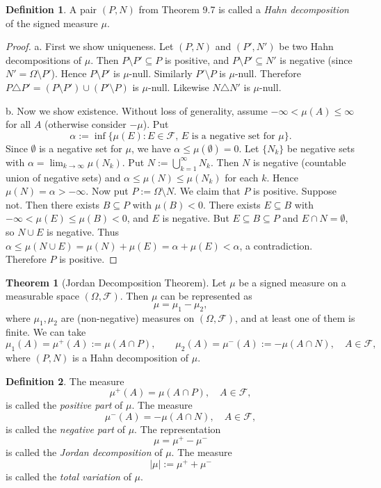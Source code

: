 \documentclass[11pt,a4paper]{article}
\theoremstyle{definition}
\newtheorem{definition}{Definition}[section]
\newtheorem{theorem}{Theorem}[section]
\begin{document}
\begin{definition}
A pair $(P,N)$ from Theorem 9.7 is called a \emph{Hahn decomposition} of the signed measure $\mu$.
\end{definition}

\begin{proof}
a. First we show uniqueness.  Let $(P,N)$ and $(P',N')$ be two Hahn decompositions of $\mu$.  Then $P\setminus P'\subseteq P$ is positive, and $P\setminus P' \subseteq N'$ is negative (since $N'=\Omega\setminus P'$).  Hence $P\setminus P'$ is $\mu$-null.  Similarly $P'\setminus P$ is $\mu$-null.  Therefore $P\triangle P'=(P\setminus P')\cup(P'\setminus P)$ is $\mu$-null.  Likewise $N\triangle N'$ is $\mu$-null.  

b. Now we show existence.  Without loss of generality, assume $-\infty<\mu(A)\le\infty$ for all $A$ (otherwise consider $-\mu$).  Put
\[
\alpha := \inf\{\mu(E):E\in\mathcal{F},\,E \text{ is a negative set for }\mu\}.
\]
Since $\emptyset$ is a negative set for $\mu$, we have $\alpha\le \mu(\emptyset)=0$.  Let $\{N_k\}$ be negative sets with $\alpha = \lim_{k\to\infty} \mu(N_k)$.  Put $N:=\bigcup_{k=1}^\infty N_k$.  Then $N$ is negative (countable union of negative sets) and $\alpha \le \mu(N)\le \mu(N_k)$ for each $k$.  Hence $\mu(N)=\alpha >-\infty$.  Now put $P := \Omega\setminus N$.  We claim that $P$ is positive.  Suppose not.  Then there exists $B\subseteq P$ with $\mu(B)<0$. There exists $E\subseteq B$ with $-\infty<\mu(E)\le\mu(B)<0$, and $E$ is negative.  But $E\subseteq B\subseteq P$ and $E\cap N=\emptyset$, so $N\cup E$ is negative.  Thus $\alpha \le \mu(N\cup E) = \mu(N) + \mu(E) = \alpha + \mu(E) < \alpha$, a contradiction.  Therefore $P$ is positive.  
\end{proof}

\begin{theorem}[Jordan Decomposition Theorem]
Let $\mu$ be a signed measure on a measurable space $(\Omega,\mathcal{F})$.  Then $\mu$ can be represented as
\[
\mu = \mu_1 - \mu_2,
\]
where $\mu_1,\mu_2$ are (non-negative) measures on $(\Omega,\mathcal{F})$, and at least one of them is finite.  We can take
\[
\mu_1(A) = \mu^+(A) := \mu(A\cap P), \qquad 
\mu_2(A) = \mu^-(A) := -\mu(A\cap N), \quad A\in\mathcal{F},
\]
where $(P,N)$ is a Hahn decomposition of $\mu$.
\end{theorem}

\begin{definition}
The measure
\[
\mu^+(A) = \mu(A\cap P),\quad A\in\mathcal{F},
\]
is called the \emph{positive part} of $\mu$.  The measure
\[
\mu^-(A) = -\mu(A\cap N),\quad A\in\mathcal{F},
\]
is called the \emph{negative part} of $\mu$.  The representation 
\[
\mu = \mu^+ - \mu^- 
\]
is called the \emph{Jordan decomposition} of $\mu$.  The measure 
\[
|\mu| := \mu^+ + \mu^-
\]
is called the \emph{total variation} of $\mu$.
\end{definition}
\end{document}

